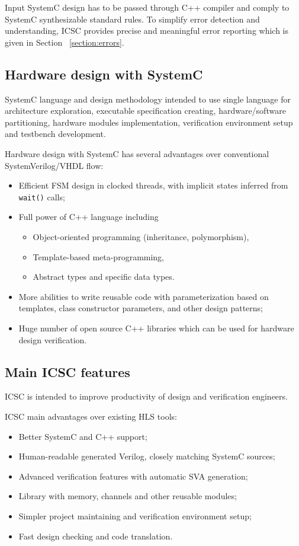 Input SystemC design has to be passed through C++ compiler and comply to SystemC synthesizable standard rules. To simplify error detection and understanding, ICSC provides precise and meaningful error reporting which is given in Section ~\ref{section:errors}.


\subsection{Hardware design with SystemC}

SystemC language and design methodology intended to use single language for architecture exploration, executable specification creating, hardware/software partitioning, hardware modules implementation, verification environment setup and testbench development.

Hardware design with SystemC has several advantages over conventional SystemVerilog/VHDL flow:
\begin{itemize}
\item Efficient FSM design in clocked threads, with implicit states inferred from {\tt wait()} calls;
\item Full power of C++ language including
	\begin{itemize}
	\item Object-oriented programming (inheritance, polymorphism), 
	\item Template-based meta-programming,
	\item Abstract types and specific data types.
	\end{itemize}
\item More abilities to write reusable code with parameterization based on templates, class constructor parameters, and other  design patterns; 
\item Huge number of open source C++ libraries which can be used for hardware design verification.
\end{itemize}

\subsection{Main ICSC features}

ICSC is intended to improve productivity of design and verification engineers.

ICSC main advantages over existing HLS tools: 
\begin{itemize}
\item Better SystemC and C++ support;
\item Human-readable generated Verilog, closely matching SystemC sources;
\item Advanced verification features with automatic SVA generation;
\item Library with memory, channels and other reusable modules;
\item Simpler project maintaining and verification environment setup;
\item Fast design checking and code translation.
\end{itemize}

